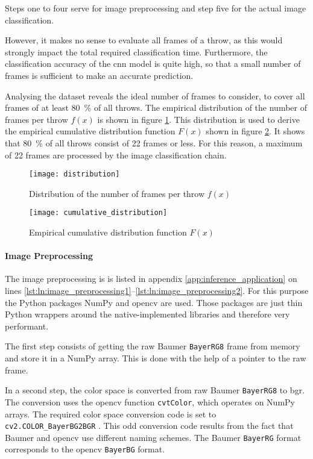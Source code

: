 Steps one to four serve for image preprocessing and step five for the actual image classification.

However, it makes no sense to evaluate all frames of a throw, as this would strongly impact the total required classification time.
Furthermore, the classification accuracy of the \acrshort{cnn} model is quite high, so that a small number of frames is sufficient to make an accurate prediction.

Analysing the dataset reveals the ideal number of frames to consider, to cover all frames of at least \SI{80}{\percent} of all throws.
The empirical distribution of the number of frames per throw $f(x)$ is shown in figure \ref{fig:distribution}.
This distribution is used to derive the empirical cumulative distribution function $F(x)$ shown in figure \ref{fig:cumulative_distribution}.
It shows that \SI{80}{\percent} of all throws consist of \num{22} frames or less.
For this reason, a maximum of \num{22} frames are processed by the image classification chain.

\begin{figure}
  \centering
  \texttt{[image: distribution]}
  \caption{Distribution of the number of frames per throw $f(x)$}
  \label{fig:distribution}
\end{figure}

\begin{figure}
  \centering
  \texttt{[image: cumulative\_distribution]}
  \caption{Empirical cumulative distribution function $F(x)$}
  \label{fig:cumulative_distribution}
\end{figure}

\paragraph{Image Preprocessing}
The image preprocessing is is listed in appendix \ref{app:inference_application} on lines \ref{lst:ln:image_preprocessing1}--\ref{lst:ln:image_preprocessing2}.
For this purpose the Python packages NumPy and \acrshort{opencv} are used.
Those packages are just thin Python wrappers around the native-implemented libraries and therefore very performant.

The first step consists of getting the raw Baumer \texttt{BayerRG8} frame from memory and store it in a NumPy array.
This is done with the help of a pointer to the raw frame.

In a second step, the color space is converted from raw Baumer \texttt{BayerRG8} to \acrshort{bgr}.
The conversion uses the \acrshort{opencv} function \texttt{cvtColor}, which operates on NumPy arrays.
The required color space conversion code is set to \texttt{cv2.COLOR\_BayerBG2BGR} \cite{inf_opencv_color}.
This odd conversion code results from the fact that Baumer and \acrshort{opencv} use different naming schemes.
The Baumer \texttt{BayerRG} format corresponds to the \acrshort{opencv} \texttt{BayerBG} format.

